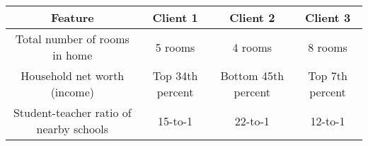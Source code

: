 \documentclass{article}
\begin{document}
\begin{longtable}[]{@{}cccc@{}}
\toprule
\begin{minipage}[b]{0.07\columnwidth}\centering\strut
Feature\strut
\end{minipage} & \begin{minipage}[b]{0.07\columnwidth}\centering\strut
Client 1\strut
\end{minipage} & \begin{minipage}[b]{0.07\columnwidth}\centering\strut
Client 2\strut
\end{minipage} & \begin{minipage}[b]{0.07\columnwidth}\centering\strut
Client 3\strut
\end{minipage}\tabularnewline
\midrule
\endhead
\begin{minipage}[t]{0.07\columnwidth}\centering\strut
Total number of rooms in home\strut
\end{minipage} & \begin{minipage}[t]{0.07\columnwidth}\centering\strut
5 rooms\strut
\end{minipage} & \begin{minipage}[t]{0.07\columnwidth}\centering\strut
4 rooms\strut
\end{minipage} & \begin{minipage}[t]{0.07\columnwidth}\centering\strut
8 rooms\strut
\end{minipage}\tabularnewline
\begin{minipage}[t]{0.07\columnwidth}\centering\strut
Household net worth (income)\strut
\end{minipage} & \begin{minipage}[t]{0.07\columnwidth}\centering\strut
Top 34th percent\strut
\end{minipage} & \begin{minipage}[t]{0.07\columnwidth}\centering\strut
Bottom 45th percent\strut
\end{minipage} & \begin{minipage}[t]{0.07\columnwidth}\centering\strut
Top 7th percent\strut
\end{minipage}\tabularnewline
\begin{minipage}[t]{0.07\columnwidth}\centering\strut
Student-teacher ratio of nearby schools\strut
\end{minipage} & \begin{minipage}[t]{0.07\columnwidth}\centering\strut
15-to-1\strut
\end{minipage} & \begin{minipage}[t]{0.07\columnwidth}\centering\strut
22-to-1\strut
\end{minipage} & \begin{minipage}[t]{0.07\columnwidth}\centering\strut
12-to-1\strut
\end{minipage}\tabularnewline
\bottomrule
\end{longtable}
\end{document}
